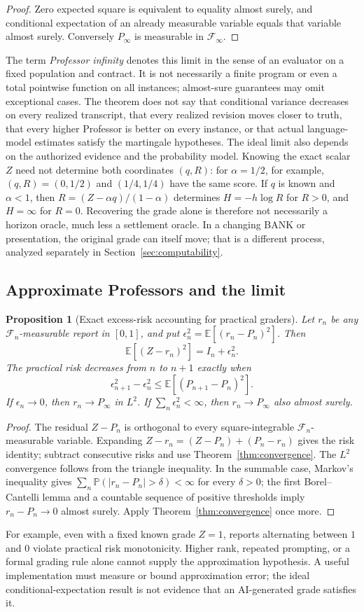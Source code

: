 \documentclass[11pt,letterpaper]{article}
\newtheorem{proposition}[theorem]{Proposition}
\theoremstyle{definition}\newtheorem{definition}[theorem]{Definition}\newtheorem{example}[theorem]{Example}\newtheorem{conjecture}[theorem]{Conjecture}
\newcommand{\E}{\mathbb E}\newcommand{\PP}{\mathbb P}\newcommand{\F}{\mathcal F}\newcommand{\Var}{\operatorname{Var}}\newcommand{\PC}{\operatorname{PC}}\newcommand{\N}{\mathbb N}
\begin{document}
\begin{proof}Zero expected square is equivalent to equality almost surely, and conditional expectation of an already measurable variable equals that variable almost surely. Conversely $P_\infty$ is measurable in $\F_\infty$.\end{proof}
The term \emph{Professor infinity} denotes this limit in the sense of an evaluator on a fixed population and contract. It is not necessarily a finite program or even a total pointwise function on all instances; almost-sure guarantees may omit exceptional cases. The theorem does not say that conditional variance decreases on every realized transcript, that every realized revision moves closer to truth, that every higher Professor is better on every instance, or that actual language-model estimates satisfy the martingale hypotheses. The ideal limit also depends on the authorized evidence and the probability model. Knowing the exact scalar $Z$ need not determine both coordinates $(q,R)$: for $\alpha=1/2$, for example, $(q,R)=(0,1/2)$ and $(1/4,1/4)$ have the same score. If $q$ is known and $\alpha<1$, then $R=(Z-\alpha q)/(1-\alpha)$ determines $H=-h\log R$ for $R>0$, and $H=\infty$ for $R=0$. Recovering the grade alone is therefore not necessarily a horizon oracle, much less a settlement oracle. In a changing BANK or presentation, the original grade can itself move; that is a different process, analyzed separately in Section~\ref{sec:computability}.
\subsection{Approximate Professors and the limit}
\begin{proposition}[Exact excess-risk accounting for practical graders]\label{prop:approx}
Let $r_n$ be any $\F_n$-measurable report in $[0,1]$, and put $\epsilon_n^2=\E[(r_n-P_n)^2]$. Then
\[
\E[(Z-r_n)^2]=I_n+\epsilon_n^2.
\]
The practical risk decreases from $n$ to $n+1$ exactly when
\[
\epsilon_{n+1}^2-\epsilon_n^2\leq \E[(P_{n+1}-P_n)^2].
\]
If $\epsilon_n\to0$, then $r_n\to P_\infty$ in $L^2$. If $\sum_n\epsilon_n^2<\infty$, then $r_n\to P_\infty$ also almost surely.
\end{proposition}
\begin{proof}
The residual $Z-P_n$ is orthogonal to every square-integrable $\F_n$-measurable variable. Expanding $Z-r_n=(Z-P_n)+(P_n-r_n)$ gives the risk identity; subtract consecutive risks and use Theorem~\ref{thm:convergence}. The $L^2$ convergence follows from the triangle inequality. In the summable case, Markov's inequality gives $\sum_n\PP(|r_n-P_n|>\delta)<\infty$ for every $\delta>0$; the first Borel--Cantelli lemma and a countable sequence of positive thresholds imply $r_n-P_n\to0$ almost surely. Apply Theorem~\ref{thm:convergence} once more.
\end{proof}
For example, even with a fixed known grade $Z=1$, reports alternating between $1$ and $0$ violate practical risk monotonicity. Higher rank, repeated prompting, or a formal grading rule alone cannot supply the approximation hypothesis. A useful implementation must measure or bound approximation error; the ideal conditional-expectation result is not evidence that an AI-generated grade satisfies it.
\end{document}
